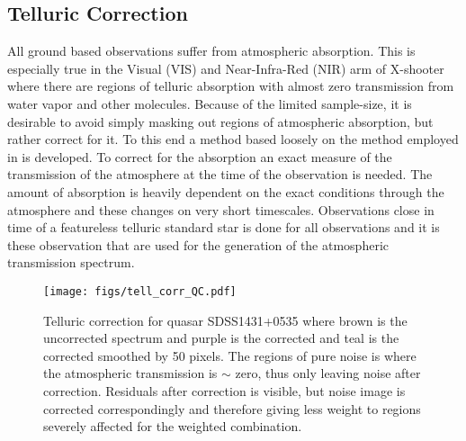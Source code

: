 \documentclass{aa}    %
\newcommand{\figlabel}[1]{\label{fig:#1}}
\newcommand{\tablabel}[1]{\label{tab:#1}}
\newcommand{\sectlabel}[1]{\label{sect:#1}}
\begin{document}
 \tablabel{targs}



\subsection{Telluric Correction}   \sectlabel{telluric}

All ground based observations suffer from atmospheric absorption. This is especially true in the Visual (VIS) and Near-Infra-Red (NIR) arm of X-shooter where there are regions of telluric absorption with almost zero transmission from water vapor and other molecules. Because of the limited sample-size, it is desirable to avoid simply masking out regions of atmospheric absorption, but rather correct for it. To this end a method based loosely on the method employed in \citet{Chen2014} is developed.
To correct for the absorption an exact measure of the transmission of the atmosphere at the time of the observation is needed. The amount of absorption is heavily dependent on the exact conditions through the atmosphere and these changes on very short timescales. Observations close in time of a featureless telluric standard star is done for all observations and it is these observation that are used for the generation of the atmospheric transmission spectrum. 

\begin{figure}[t!]
  \centering
  \texttt{[image: figs/tell\_corr\_QC.pdf]}
  \caption[]{Telluric correction for quasar SDSS1431+0535 where brown is the uncorrected spectrum and purple is the corrected and teal is the corrected smoothed by 50 pixels. The regions of pure noise is where the atmospheric transmission is $\sim$ zero, thus only leaving noise after correction. Residuals after correction is visible, but noise image is corrected correspondingly and therefore giving less weight to regions severely affected for the weighted combination.}
\figlabel{telluric_qc}
\end{figure}
\end{document}
